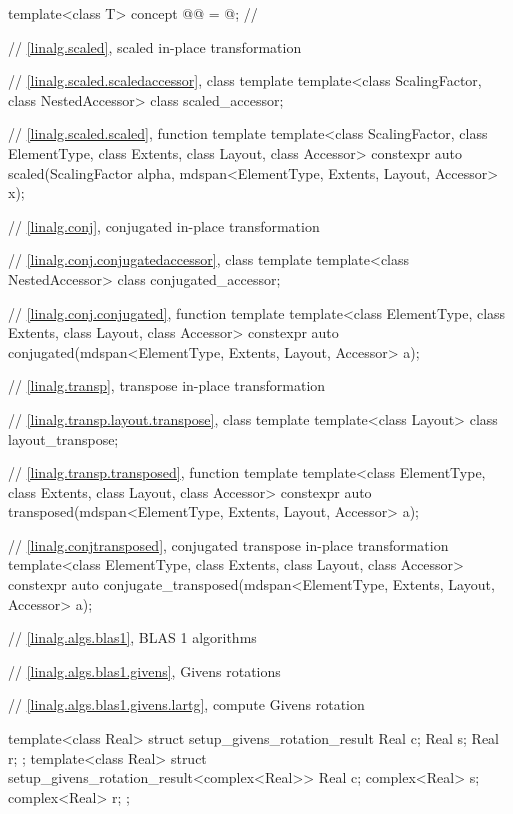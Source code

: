 \begin{codeblock}
{  template<class T>
    concept @@ = @\seebelow@;                   // \expos

  // \ref{linalg.scaled}, scaled in-place transformation

  // \ref{linalg.scaled.scaledaccessor}, class template 
  template<class ScalingFactor, class NestedAccessor>
    class scaled_accessor;

  // \ref{linalg.scaled.scaled}, function template 
  template<class ScalingFactor,
           class ElementType, class Extents, class Layout, class Accessor>
    constexpr auto scaled(ScalingFactor alpha, mdspan<ElementType, Extents, Layout, Accessor> x);

  // \ref{linalg.conj}, conjugated in-place transformation

  // \ref{linalg.conj.conjugatedaccessor}, class template 
  template<class NestedAccessor>
    class conjugated_accessor;

  // \ref{linalg.conj.conjugated}, function template 
  template<class ElementType, class Extents, class Layout, class Accessor>
    constexpr auto conjugated(mdspan<ElementType, Extents, Layout, Accessor> a);

  // \ref{linalg.transp}, transpose in-place transformation

  // \ref{linalg.transp.layout.transpose}, class template 
  template<class Layout>
    class layout_transpose;

  // \ref{linalg.transp.transposed}, function template 
  template<class ElementType, class Extents, class Layout, class Accessor>
    constexpr auto transposed(mdspan<ElementType, Extents, Layout, Accessor> a);

  // \ref{linalg.conjtransposed}, conjugated transpose in-place transformation
  template<class ElementType, class Extents, class Layout, class Accessor>
    constexpr auto conjugate_transposed(mdspan<ElementType, Extents, Layout, Accessor> a);

  // \ref{linalg.algs.blas1}, BLAS 1 algorithms

  // \ref{linalg.algs.blas1.givens}, Givens rotations

  // \ref{linalg.algs.blas1.givens.lartg}, compute Givens rotation

  template<class Real>
    struct setup_givens_rotation_result {
      Real c;
      Real s;
      Real r;
    };
  template<class Real>
    struct setup_givens_rotation_result<complex<Real>> {
      Real c;
      complex<Real> s;
      complex<Real> r;
    };

}
\end{codeblock}
